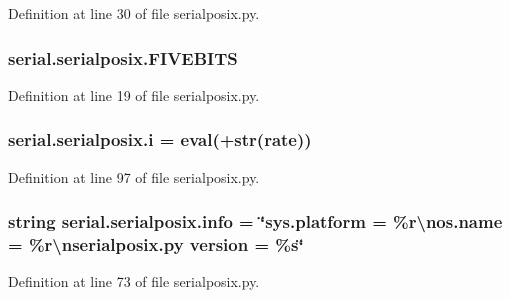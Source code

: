 Definition at line 30 of file serialposix.\+py.

\subsubsection[{\texorpdfstring{F\+I\+V\+E\+B\+I\+TS}{FIVEBITS}}]{\setlength{\rightskip}{0pt plus 5cm}serial.\+serialposix.\+F\+I\+V\+E\+B\+I\+TS}\hypertarget{namespaceserial_1_1serialposix_ae35e9f19b0bcb55905ee62e57ebe2265}{}\label{namespaceserial_1_1serialposix_ae35e9f19b0bcb55905ee62e57ebe2265}


Definition at line 19 of file serialposix.\+py.

\subsubsection[{\texorpdfstring{i}{i}}]{\setlength{\rightskip}{0pt plus 5cm}serial.\+serialposix.\+i = eval(\textquotesingle{}+str(rate))}\hypertarget{namespaceserial_1_1serialposix_a0a55a600be14d50e8adc01088215bbb1}{}\label{namespaceserial_1_1serialposix_a0a55a600be14d50e8adc01088215bbb1}


Definition at line 97 of file serialposix.\+py.

\subsubsection[{\texorpdfstring{info}{info}}]{\setlength{\rightskip}{0pt plus 5cm}string serial.\+serialposix.\+info = \char`\"{}sys.\+platform = \%r\textbackslash{}nos.\+name = \%r\textbackslash{}nserialposix.\+py version = \%{\bf s}\char`\"{}}\hypertarget{namespaceserial_1_1serialposix_a7fb418820b365d6dbde6236e6cf518f1}{}\label{namespaceserial_1_1serialposix_a7fb418820b365d6dbde6236e6cf518f1}


Definition at line 73 of file serialposix.\+py.


